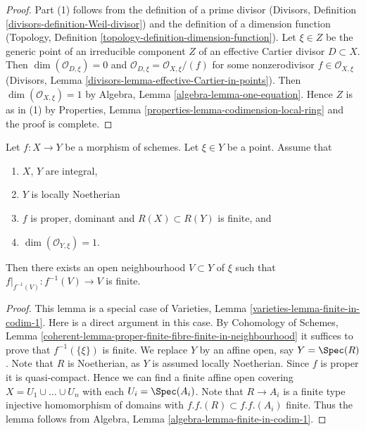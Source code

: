 \begin{proof}
Part (1) follows from the definition of a prime divisor
(Divisors, Definition \ref{divisors-definition-Weil-divisor})
and the definition of a dimension function
(Topology, Definition \ref{topology-definition-dimension-function}).
Let $\xi \in Z$ be the generic point of an irreducible component $Z$ of
an effective Cartier divisor $D \subset X$.
Then $\dim(\mathcal{O}_{D, \xi}) = 0$ and
$\mathcal{O}_{D, \xi} = \mathcal{O}_{X, \xi}/(f)$ for some
nonzerodivisor $f \in \mathcal{O}_{X, \xi}$ (Divisors,
Lemma \ref{divisors-lemma-effective-Cartier-in-points}).
Then $\dim(\mathcal{O}_{X, \xi}) = 1$ by
Algebra, Lemma \ref{algebra-lemma-one-equation}. Hence $Z$ is as in (1) by
Properties, Lemma \ref{properties-lemma-codimension-local-ring}
and the proof is complete.
\end{proof}

\begin{lemma}
\label{lemma-finite-in-codimension-one}
Let $f : X \to Y$ be a morphism of schemes.
Let $\xi \in Y$ be a point.
Assume that
\begin{enumerate}
\item $X$, $Y$ are integral,
\item $Y$ is locally Noetherian
\item $f$ is proper, dominant and $R(X) \subset R(Y)$ is finite, and
\item $\dim(\mathcal{O}_{Y, \xi}) = 1$.
\end{enumerate}
Then there exists an open neighbourhood $V \subset Y$ of $\xi$
such that $f|_{f^{-1}(V)} : f^{-1}(V) \to V$ is finite.
\end{lemma}

\begin{proof}
This lemma is a special case of
Varieties, Lemma \ref{varieties-lemma-finite-in-codim-1}.
Here is a direct argument in this case.
By Cohomology of Schemes,
Lemma \ref{coherent-lemma-proper-finite-fibre-finite-in-neighbourhood}
it suffices to prove that $f^{-1}(\{\xi\})$ is finite.
We replace $Y$ by an affine open, say $Y = \Spec(R)$.
Note that $R$ is Noetherian, as $Y$ is assumed locally Noetherian.
Since $f$ is proper it is quasi-compact. Hence we can find a finite
affine open covering $X = U_1 \cup \ldots \cup U_n$ with
each $U_i = \Spec(A_i)$. Note that $R \to A_i$ is a
finite type injective homomorphism of domains with
$f.f.(R) \subset f.f.(A_i)$ finite. Thus the lemma follows
from Algebra, Lemma \ref{algebra-lemma-finite-in-codim-1}.
\end{proof}


